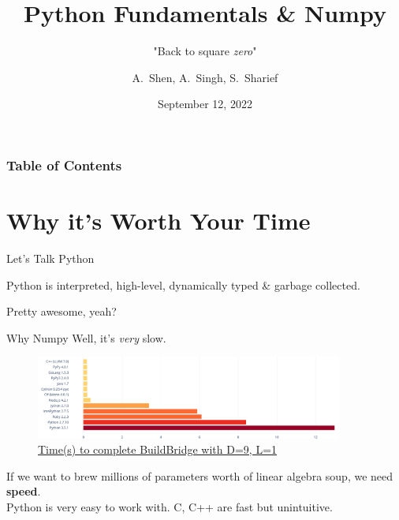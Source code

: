 \documentclass{beamer}
\title[Python \& Numpy] %
{Python Fundamentals \& Numpy}
\subtitle{"Back to square \textit{zero}"}
\author[SIGAI] %
{A.~Shen, A.~Singh, S.~Sharief}
\date{September 12, 2022}
\begin{document}
\frame{\titlepage}


\begin{frame}
\frametitle{Table of Contents}
\tableofcontents
\end{frame}


\section{Why it's Worth Your Time}

\begin{frame}{Let's Talk Python}
	\begin{center}
		Python is interpreted\pause, high-level\pause, dynamically typed \pause \& garbage collected. \newline \\ \pause
	\end{center}

	\begin{center}
		Pretty awesome, yeah?
	\end{center}
\end{frame}

\begin{frame}{Why Numpy}
	Well, it's \textit{very} slow. 
	\begin{figure}[h!]
		\includegraphics[width=0.9\textwidth]{images/speed}
		\caption{\href{https://www.snazar.com/articles/how-slow-is-python/}{Time(s) to complete BuildBridge with D=9, L=1}} %
	\end{figure} \pause
	If we want to brew millions of parameters worth of linear algebra soup, we need \textbf{speed}. \newline \\ \pause
	Python is very easy to work with. C, C++ are fast but unintuitive. 
\end{frame}
\end{document}
